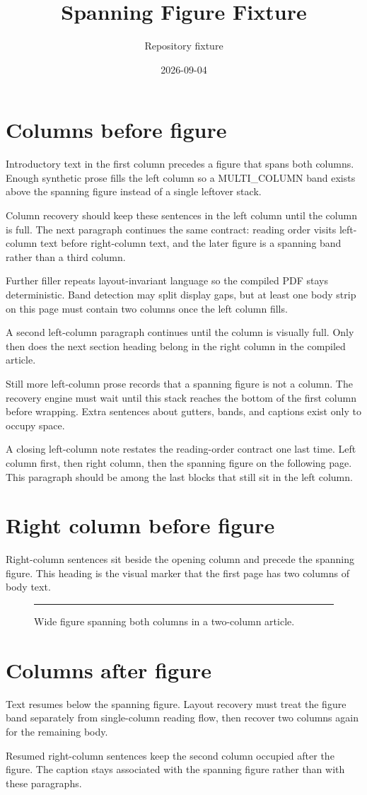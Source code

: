 \documentclass[11pt,a4paper,twocolumn]{article}
\title{Spanning Figure Fixture}
\author{Repository fixture}
\date{2026-09-04}%
\begin{document}
\maketitle

\section{Columns before figure}
Introductory text in the first column precedes a figure that spans both
columns. Enough synthetic prose fills the left column so a MULTI\_COLUMN
band exists above the spanning figure instead of a single leftover stack.

Column recovery should keep these sentences in the left column until the
column is full. The next paragraph continues the same contract: reading
order visits left-column text before right-column text, and the later
figure is a spanning band rather than a third column.

Further filler repeats layout-invariant language so the compiled PDF stays
deterministic. Band detection may split display gaps, but at least one
body strip on this page must contain two columns once the left column
fills.

A second left-column paragraph continues until the column is visually
full. Only then does the next section heading belong in the right column
in the compiled article.

Still more left-column prose records that a spanning figure is not a
column. The recovery engine must wait until this stack reaches the bottom
of the first column before wrapping. Extra sentences about gutters,
bands, and captions exist only to occupy space.

A closing left-column note restates the reading-order contract one last
time. Left column first, then right column, then the spanning figure on
the following page. This paragraph should be among the last blocks that
still sit in the left column.

\section{Right column before figure}
Right-column sentences sit beside the opening column and precede the
spanning figure. This heading is the visual marker that the first page
has two columns of body text.

\onecolumn
\begin{figure}[h]
  \centering
  \rule{0.85\textwidth}{3cm}
  \caption{Wide figure spanning both columns in a two-column article.}\label{fig:span}
\end{figure}

\twocolumn
\section{Columns after figure}
Text resumes below the spanning figure. Layout recovery must treat the
figure band separately from single-column reading flow, then recover two
columns again for the remaining body.

Resumed right-column sentences keep the second column occupied after the
figure. The caption stays associated with the spanning figure rather than
with these paragraphs.
\end{document}
